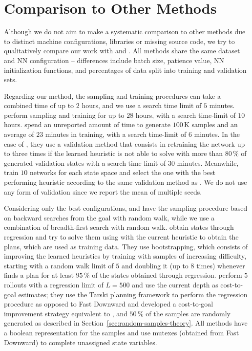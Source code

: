 \chapter{Comparison to Other Methods}
\label{sec:comparison}

Although we do not aim to make a systematic comparison to other methods due to distinct machine configurations, libraries or missing source code, we try to qualitatively compare our work with \citeyear{Ferber.etal/2022} and \citeyear{OToole/2022}. All methods share the same dataset and NN configuration -- differences include batch size, patience value, NN initialization functions, and percentages of data split into training and validation sets.

Regarding our method, the sampling and training procedures can take a combined time of up to $2$ hours, and we use a search time limit of $5$ minutes. \citeyear{Ferber.etal/2022} perform sampling and training for up to $28$ hours, with a search time-limit of $10$ hours. \citeyear{OToole/2022} spend an unreported amount of time to generate $100$\,K samples and an average of $23$ minutes in training, with a search time-limit of $6$ minutes. In the case of \citeyear{Ferber.etal/2022}, they use a validation method that consists in retraining the network up to three times if the learned heuristic is not able to solve with \gbfs more than $80\,\%$ of generated validation states with a search time-limit of $30$ minutes. Meanwhile, \citeyear{OToole/2022} train $10$ networks for each state space and select the one with the best performing heuristic according to the same validation method as \citeyear{Ferber.etal/2022}. We do not use any form of validation since we report the mean of multiple seeds.

Considering only the best configurations, \citeyear{Ferber.etal/2022} and \citeyear{OToole/2022} have the sampling procedure based on backward searches from the goal with random walk, while we use a combination of breadth-first search with random walk. \citeyear{Ferber.etal/2022} obtain states through regression and try to solve them using \gbfs with the current heuristic to obtain the plans, which are used as training data. They use bootstrapping, which consists of improving the learned heuristics by training with samples of increasing difficulty, starting with a random walk limit of $5$ and doubling it (up to $8$ times) whenever \gbfs finds a plan for at least $95\,\%$ of the states obtained through regression. \citeyear{OToole/2022} perform $5$ rollouts with a regression limit of $L=500$ and use the current depth as cost-to-goal estimates; they use the Tarski planning framework to perform the regression procedure as opposed to Fast Downward and developed a cost-to-goal improvement strategy equivalent to \hmin, and $50\,\%$ of the samples are randomly generated as described in Section~\ref{sec:random-samples-theory}. All methods have a boolean representation for the samples and use mutexes (obtained from Fast Downward) to complete unassigned state variables.

